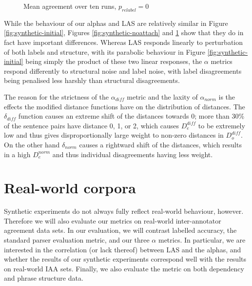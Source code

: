 \documentclass[11pt]{article}
\begin{document}
\begin{figure}
    \begin{center}
        
    \end{center}
    \caption{Mean agreement over ten runs, $p_{relabel} = 0$}
    \label{fig:synthetic-nolabel}
\end{figure}

While the behaviour of our alphas and LAS are relatively similar in Figure
\ref{fig:synthetic-initial}, Figures \ref{fig:synthetic-noattach} and
\ref{fig:synthetic-nolabel} show that they do in fact have important
differences. Whereas LAS responds linearly to perturbation of both labels and
structure, with its parabolic behaviour in Figure \ref{fig:synthetic-initial}
being simply the product of these two linear responses, the $\alpha$ metrics
respond differently to structural noise and label noise, with label
disagreements being penalised less harshly than structural disagreements.


The reason for the strictness of the $\alpha_{diff}$ metric and the laxity of
$\alpha_{norm}$ is the effects the modified distance functions have on the
distribution of distances. The $\delta_{diff}$ function causes an extreme
shift of the distances towards 0; more than 30\% of the sentence pairs have
distance 0, 1, or 2, which causes $D_e^{diff}$ to be extremely low and thus
gives disproportionally large weight to non-zero distances in $D_o^{diff}$. On
the other hand $\delta_{norm}$ causes a rightward shift of the distances,
which results in a high $D_e^{norm}$ and thus individual disagreements having
less weight.

\section{Real-world corpora}
Synthetic experiments do not always fully reflect real-world behaviour,
however. Therefore we will also evaluate our metrics on real-world
inter-annotator agreement data sets. In our evaluation, we will contrast
labelled accuracy, the standard parser evaluation metric, and our three
$\alpha$ metrics. In particular, we are interested in the correlation (or lack
thereof) between LAS and the alphas, and whether the results of our synthetic
experiments correspond well with the results on real-world IAA sets. Finally,
we also evaluate the metric on both dependency and phrase structure data.
\end{document}
